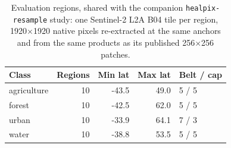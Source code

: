 \begin{table}[t]
\centering
\caption{Evaluation regions, shared with the companion \texttt{healpix-resample} study: one Sentinel-2 L2A B04 tile per region, 1920$\times$1920 native pixels re-extracted at the same anchors and from the same products as its published 256$\times$256 patches.}
\label{tab:benchmark_scenes}
\begin{tabular}{lrrrl}
\toprule
Class & Regions & Min lat & Max lat & Belt / cap \\
\midrule
agriculture & 10 & -43.5 & 49.0 & 5 / 5 \\
forest & 10 & -42.5 & 62.0 & 5 / 5 \\
urban & 10 & -33.9 & 64.1 & 7 / 3 \\
water & 10 & -38.8 & 53.5 & 5 / 5 \\
\bottomrule
\end{tabular}
\end{table}
